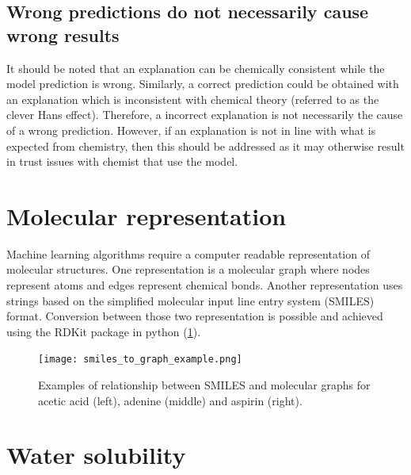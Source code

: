 \subsection{Wrong predictions do not necessarily cause wrong results}


It should be noted that an explanation can be chemically consistent while 
the model prediction is wrong. Similarly, a correct prediction could be 
obtained with an explanation which is inconsistent with chemical theory
(referred to as the clever Hans effect\cite{lapuschkin2019unmasking}). Therefore, a incorrect explanation 
is not necessarily the cause of a wrong prediction. However, if an 
explanation is not in line with what is expected from chemistry, then 
this should be addressed as it may otherwise result in trust issues 
with chemist that use the model.



\section{Molecular representation}


Machine learning algorithms require a computer readable representation of molecular structures. 
One representation is a molecular graph where nodes represent atoms and edges 
represent chemical bonds. Another representation uses strings based on the simplified 
molecular input line entry system (SMILES) 
format.\cite{weininger1988smiles} Conversion between those two representation is 
possible and achieved using the RDKit package in python (\cref{fig:smiles_and_graphs}).
\cite{landrum2010r}


\begin{figure}[h]
    \centering
    \texttt{[image: smiles\_to\_graph\_example.png]}
    \caption{Examples of relationship between SMILES and molecular graphs for acetic acid (left),
    adenine (middle) and aspirin (right).}
    \label{fig:smiles_and_graphs}
\end{figure}


\section{Water solubility}


